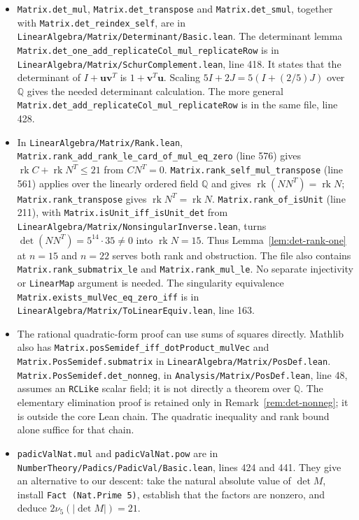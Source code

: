 \documentclass[11pt]{article}
\newcommand\rats{{\mathbb Q}}
\newcommand\Zu{{\mathbf u}}
\newcommand\Zv{{\mathbf v}}
\newcommand\opk[1]{\mathop{\mathrm{#1}}\nolimits}
\newcommand\rk{\opk{rk}}
\theoremstyle{definition}
\newcommand{\code}[1]{{\small\nolinkurl{#1}}}
\begin{document}
\begingroup
\raggedright
\begin{itemize}
\item \code{Matrix.det_mul}, \code{Matrix.det_transpose} and
\code{Matrix.det_smul}, together with \code{Matrix.det_reindex_self}, are in
\code{LinearAlgebra/Matrix/Determinant/Basic.lean}.
The determinant lemma
\code{Matrix.det_one_add_replicateCol_mul_replicateRow} is in
\code{LinearAlgebra/Matrix/SchurComplement.lean}, line 418.
It states that the determinant of $I+\Zu\Zv^T$ is
$1+\Zv^T\Zu$. Scaling $5I+2J=5(I+(2/5)J)$ over $\rats$ gives the
needed determinant calculation.
The more general \code{Matrix.det_add_replicateCol_mul_replicateRow}
is in the same file, line 428.
\item In \code{LinearAlgebra/Matrix/Rank.lean},
\code{Matrix.rank_add_rank_le_card_of_mul_eq_zero} (line 576) gives
$\rk C+\rk N^T\le21$ from $CN^T=0$.
\code{Matrix.rank_self_mul_transpose} (line 561) applies over the
linearly ordered field $\rats$ and gives $\rk(NN^T)=\rk N$;
\code{Matrix.rank_transpose} gives $\rk N^T=\rk N$.
\code{Matrix.rank_of_isUnit} (line 211), with
\code{Matrix.isUnit_iff_isUnit_det} from
\code{LinearAlgebra/Matrix/NonsingularInverse.lean}, turns
$\det(NN^T)=5^{14}\cdot35\ne0$ into $\rk N=15$.
Thus Lemma~\ref{lem:det-rank-one} at $n=15$ and $n=22$ serves both
rank and obstruction. The file also contains
\code{Matrix.rank_submatrix_le} and \code{Matrix.rank_mul_le}.
No separate injectivity or \code{LinearMap} argument is needed.
The singularity equivalence \code{Matrix.exists_mulVec_eq_zero_iff}
is in \code{LinearAlgebra/Matrix/ToLinearEquiv.lean}, line 163.
\item The rational quadratic-form proof can use sums of squares
directly. Mathlib also has
\code{Matrix.posSemidef_iff_dotProduct_mulVec} and
\code{Matrix.PosSemidef.submatrix} in
\code{LinearAlgebra/Matrix/PosDef.lean}.
\code{Matrix.PosSemidef.det_nonneg}, in
\code{Analysis/Matrix/PosDef.lean}, line 48, assumes an
\code{RCLike} scalar field; it is not directly a theorem over
$\rats$. The elementary elimination proof is retained only in
Remark~\ref{rem:det-nonneg}; it is outside the core Lean chain.
The quadratic inequality and rank bound alone suffice for that chain.
\item \code{padicValNat.mul} and \code{padicValNat.pow} are in
\code{NumberTheory/Padics/PadicVal/Basic.lean}, lines 424 and 441.
They give an alternative to our descent: take the natural absolute
value of $\det M$, install \code{Fact (Nat.Prime 5)}, establish that
the factors are nonzero, and deduce $2\nu_5(|\det M|)=21$.

\end{itemize}
\end{document}
